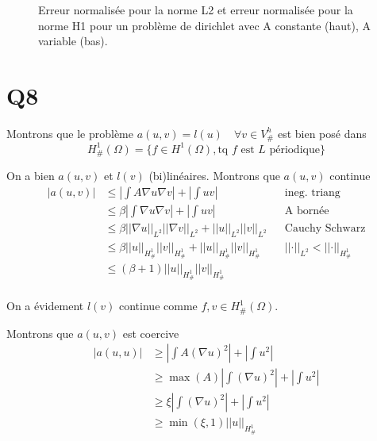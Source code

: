 \documentclass[11pt]{article}
\newcommand{\norm}[1]{\left|\left|#1\right|\right|}
\begin{document}
\begin{figure}
  \centering
  \caption{Erreur normalisée pour la norme L2 et erreur normalisée pour la norme H1 pour un problème de dirichlet avec A constante (haut), A variable (bas).}
  \label{fig:acst}
\end{figure}

\section{Q8}

Montrons que le problème $a(u,v) = l(u) \quad \forall v \in V^h_{\#}$ est bien posé dans
\begin{equation}
  H^1_{\#}(\Omega) = \bigg\{ f \in H^1(\Omega), \mbox{tq $f$ est $L$ périodique} \bigg\}
\end{equation}

On a bien $a(u,v)$ et $l(v)$ (bi)linéaires. Montrons que $a(u,v)$ continue 
\begin{align}
  \label{eq:ac}
  |a(u,v)| &\leq \left| \int A \nabla u \nabla v \right| + \left| \int u v \right| && \mbox{ineg. triang} \\
           &\leq \beta \left| \int \nabla u \nabla v \right| + \left| \int u v \right| && \mbox{A bornée} \\
           &\leq \beta \norm{\nabla u}_{L^2} \norm{\nabla v}_{L^2} + \norm{u}_{L^2}\norm{v}_{L^2} && \mbox{Cauchy Schwarz} \\
           &\leq \beta \norm{u}_{H^1_{\#}} \norm{v}_{H^1_{\#}} + \norm{u}_{H^1_{\#}}\norm{v}_{H^1_{\#}} && \norm{\cdot}_{L^2}<\norm{\cdot}_{H^1_{\#}} \\
           &\leq (\beta+1) \norm{ u}_{H^1_{\#}} \norm{ v}_{H^1_{\#}}   \\
\end{align}

On a évidement $l(v)$ continue comme $f, v \in H^1_{\#}(\Omega)$. 

Montrons que $a(u,v)$ est coercive
\begin{align}
  \label{eq:co}
  |a(u,u)| &\geq \left|\int A (\nabla u)^2 \right| + \left|\int u^2 \right| \\
           &\geq \max(A) \left|\int (\nabla u)^2 \right| + \left|\int u^2 \right| \\
           &\geq \xi \left|\int (\nabla u)^2 \right| + \left|\int  u^2 \right| \\
           &\geq \min(\xi,1) \norm{u}_{H^1_{\#}}
\end{align}
\end{document}
